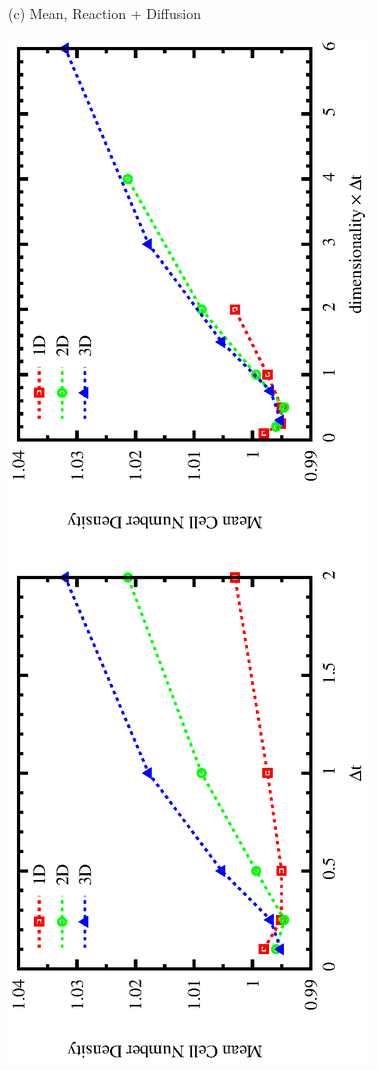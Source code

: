 \documentclass{article}
\begin{document}
\begin{figure}
\begin{center}
(c) Mean, Reaction + Diffusion
\vspace{-5mm}
\end{center}
\includegraphics[angle=270,width=\linewidth]{fig1/mean_react.eps}
\caption{\label{fig_meanvar}}
\end{figure}
\end{document}
